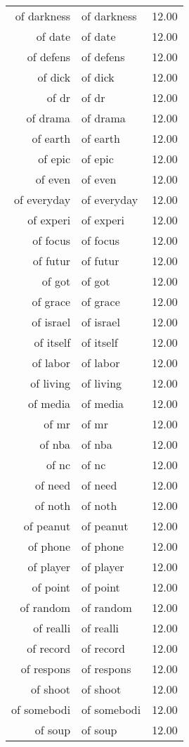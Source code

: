 \begin{table}[ht]
\begin{tabular}{rlr}
  of darkness & of darkness & 12.00 \\ 
  of date & of date & 12.00 \\ 
  of defens & of defens & 12.00 \\ 
  of dick & of dick & 12.00 \\ 
  of dr & of dr & 12.00 \\ 
  of drama & of drama & 12.00 \\ 
  of earth & of earth & 12.00 \\ 
  of epic & of epic & 12.00 \\ 
  of even & of even & 12.00 \\ 
  of everyday & of everyday & 12.00 \\ 
  of experi & of experi & 12.00 \\ 
  of focus & of focus & 12.00 \\ 
  of futur & of futur & 12.00 \\ 
  of got & of got & 12.00 \\ 
  of grace & of grace & 12.00 \\ 
  of israel & of israel & 12.00 \\ 
  of itself & of itself & 12.00 \\ 
  of labor & of labor & 12.00 \\ 
  of living & of living & 12.00 \\ 
  of media & of media & 12.00 \\ 
  of mr & of mr & 12.00 \\ 
  of nba & of nba & 12.00 \\ 
  of nc & of nc & 12.00 \\ 
  of need & of need & 12.00 \\ 
  of noth & of noth & 12.00 \\ 
  of peanut & of peanut & 12.00 \\ 
  of phone & of phone & 12.00 \\ 
  of player & of player & 12.00 \\ 
  of point & of point & 12.00 \\ 
  of random & of random & 12.00 \\ 
  of realli & of realli & 12.00 \\ 
  of record & of record & 12.00 \\ 
  of respons & of respons & 12.00 \\ 
  of shoot & of shoot & 12.00 \\ 
  of somebodi & of somebodi & 12.00 \\ 
  of soup & of soup & 12.00 \\ 

\end{tabular}
\end{table}
